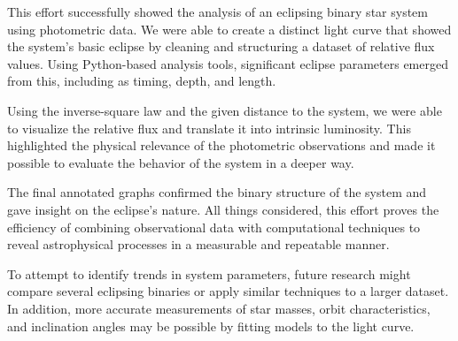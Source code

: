 This effort successfully showed the analysis of an eclipsing binary star system using photometric
data. We were able to create a distinct light curve that showed the system's basic eclipse by
cleaning and structuring a dataset of relative flux values. Using Python-based analysis tools,
significant eclipse parameters emerged from this, including as timing, depth, and length.

Using the inverse-square law and the given distance to the system, we were able to visualize the
relative flux and translate it into intrinsic luminosity. This highlighted the physical relevance
of the photometric observations and made it possible to evaluate the behavior of the system in a
deeper way.

The final annotated graphs confirmed the binary structure of the system and gave insight on the
eclipse's nature. All things considered, this effort proves the efficiency of combining
observational data with computational techniques to reveal astrophysical processes in a measurable
and repeatable manner.

To attempt to identify trends in system parameters, future research might compare several eclipsing
binaries or apply similar techniques to a larger dataset. In addition, more accurate measurements of
star masses, orbit characteristics, and inclination angles may be possible by fitting models to the
light curve.
